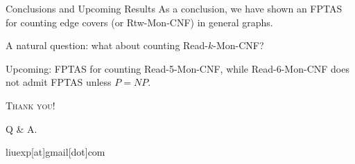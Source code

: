 \documentclass[mathserif]{beamer}
\begin{document}
\begin{frame}{Conclusions and Upcoming Results}
As a conclusion, we have shown an FPTAS for counting edge covers (or Rtw-Mon-CNF) in general graphs. 
\bigskip

A natural question: what about counting Read-$k$-Mon-CNF?
\bigskip

\pause
Upcoming: FPTAS for counting Read-5-Mon-CNF, while Read-6-Mon-CNF does not admit FPTAS unless $P=NP$.
\end{frame}
\begin{frame}
	\begin{center}
		\Huge \scshape Thank you!
	\end{center}

	\bigskip
	\begin{center}
		\huge Q \& A.
\bigskip

		liuexp[at]gmail[dot]com
	\end{center}
\end{frame}
\end{document}
